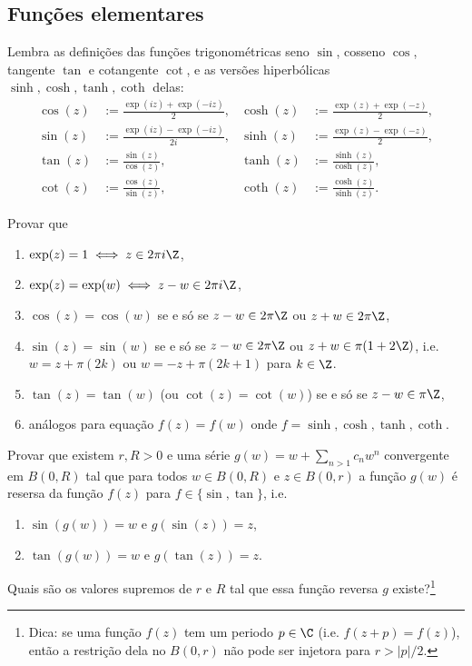 \subsection{Funções elementares}
\label{ss:elementar}

Lembra as definições das funções trigonométricas seno $\sin$, cosseno $\cos$,
tangente $\tan$ e cotangente $\cot$,
e as versões hiperbólicas $\sinh, \cosh, \tanh, \coth$ delas:
\begin{align*}
\cos(z) &:= \frac{\exp(iz) + \exp(-iz)}{2}, &
\cosh(z) &:= \frac{\exp(z) + \exp(-z)}{2}, \\
\sin(z) &:= \frac{\exp(iz) - \exp(-iz)}{2i}, &
\sinh(z) &:= \frac{\exp(z) - \exp(-z)}{2}, \\
\tan(z) &:= \frac{\sin(z)}{\cos(z)}, &
\tanh(z) &:= \frac{\sinh(z)}{\cosh(z)}, \\
\cot(z) &:= \frac{\cos(z)}{\sin(z)}, &
\coth(z) &:= \frac{\cosh(z)}{\sinh(z)}.
\end{align*}

\begin{problema}
Provar que
\begin{enumerate}
\item $\exp(z) = 1 \iff z\in 2\pi i\Z$,
\item $\exp(z) = \exp(w) \iff z-w \in 2\pi i\Z$,
\item $\cos(z) = \cos(w)$ se e só se $z-w \in 2\pi\Z$ ou $z+w \in 2\pi\Z$,
\item $\sin(z) = \sin(w)$ se e só se $z-w \in 2\pi\Z$ ou $z+w \in \pi(1+2\Z)$,
i.e. $w=z+\pi (2k)$ ou $w = -z+\pi(2k+1)$ para $k\in\Z$.
\item $\tan(z) = \tan(w)$ (ou $\cot(z) = \cot(w)$)
se e só se $z-w\in\pi\Z$,
\item análogos para equação $f(z) = f(w)$ onde $f = \sinh, \cosh, \tanh, \coth$.
\end{enumerate}
\end{problema}

\begin{problema}
Provar que existem $r,R>0$ e uma série $g(w) = w + \sum_{n>1} c_n w^n$ convergente em $B(0,R)$
tal que para todos $w\in B(0,R)$ e $z\in B(0,r)$ a função $g(w)$ é resersa da função $f(z)$
para $f\in \{\sin,\tan\}$, i.e.
\begin{enumerate}
\item $\sin(g(w)) = w$ e $g(\sin(z)) = z$,
\item $\tan(g(w)) = w$ e $g(\tan(z)) = z$.
\end{enumerate}
Quais são os valores supremos de $r$ e $R$ tal que essa função reversa $g$ existe?\footnote{Dica:
se uma função $f(z)$ tem um periodo $p\in\C$ (i.e. $f(z+p)=f(z)$),
então a restrição dela no $B(0,r)$
não pode ser injetora para $r>|p|/2$.}
\end{problema}

